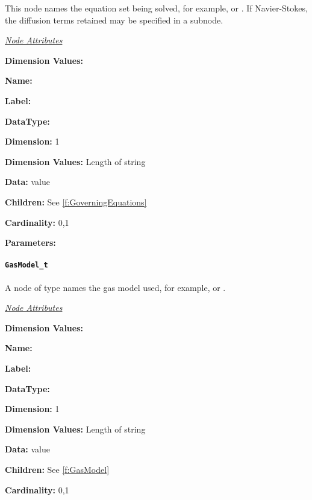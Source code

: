 This node names the equation set being solved, for example,
 or . If Navier-Stokes, the
diffusion terms retained may be specified in a 
subnode.

\textit{\uline{Node Attributes}}
\begin{Ventryic}{\textbf{Dimension Values:}}
\item [\textbf{Name:}]
\item [\textbf{Label:}]
\item [\textbf{DataType:}]
\item [\textbf{Dimension:}]
      1
\item [\textbf{Dimension Values:}]
      Length of string
\item [\textbf{Data:}]
       value
\item [\textbf{Children:}]
      See \autoref{f:GoverningEquations}
\item [\textbf{Cardinality:}]
      0,1
\item [\textbf{Parameters:}]
\end{Ventryic}

\paragraph{\texttt{GasModel\_t}}

A node of type  names the gas model used, for example,
 or .

\textit{\uline{Node Attributes}}
\begin{Ventryic}{\textbf{Dimension Values:}}
\item [\textbf{Name:}]
\item [\textbf{Label:}]
\item [\textbf{DataType:}]
\item [\textbf{Dimension:}]
      1
\item [\textbf{Dimension Values:}]
      Length of string
\item [\textbf{Data:}]
       value
\item [\textbf{Children:}]
      See \autoref{f:GasModel}
\item [\textbf{Cardinality:}]
      0,1
\end{Ventryic}

